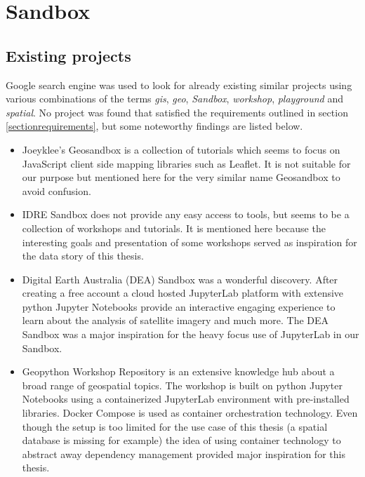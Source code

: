 \documentclass[11pt, a4paper, oneside, parskip=full-]{scrartcl}
\begin{document}
\section{Sandbox}

\subsection{Existing projects}
Google search engine was used to look for already existing similar projects
using various combinations of the terms \emph{gis}, \emph{geo}, \emph{Sandbox},
\emph{workshop}, \emph{playground} and \emph{spatial}. No project was found that
satisfied the requirements outlined in section \ref{sectionrequirements}, but
some noteworthy findings are listed below.

\begin{itemize}
  \item Joeyklee's Geosandbox\cite{project-joeyklee} is a collection of
  tutorials which seems to focus on JavaScript client side mapping libraries
  such as Leaflet. It is not suitable for our purpose but mentioned here for the
  very similar name Geosandbox to avoid confusion.
  \item IDRE Sandbox\cite{project-idre} does not provide any easy access to
  tools, but seems to be a collection of workshops and tutorials. It is
  mentioned here because the interesting goals and presentation of some
  workshops served as inspiration for the data story of this thesis.
  \item Digital Earth Australia (DEA) Sandbox\cite{project-dea} was a wonderful
  discovery. After creating a free account a cloud hosted
  JupyterLab\cite{jupyterlab} platform with extensive python Jupyter Notebooks
  provide an interactive engaging experience to learn about the analysis of
  satellite imagery and much more. The DEA Sandbox was a major inspiration for
  the heavy focus use of JupyterLab in our Sandbox.
  \item Geopython Workshop Repository\cite{project-geopython} is an extensive
  knowledge hub about a broad range of geospatial topics. The workshop is built
  on python Jupyter Notebooks using a containerized JupyterLab environment with
  pre-installed libraries. Docker Compose\cite{dockercompose} is used as
  container orchestration technology. Even though the setup is too limited for
  the use case of this thesis (a spatial database is missing for example) the
  idea of using container technology to abstract away dependency management
  provided major inspiration for this thesis.
\end{itemize}
\end{document}
